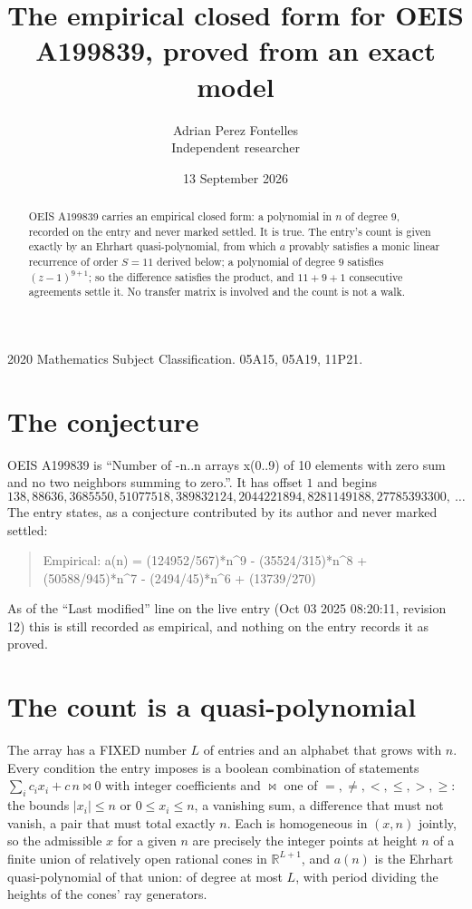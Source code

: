 \documentclass[11pt,a4paper]{article}
\title{The empirical closed form for OEIS A199839, proved from an exact model}
\author{Adrian Perez Fontelles\\ \small Independent researcher}
\date{13 September 2026}
\theoremstyle{plain}
\theoremstyle{definition}
\begin{document}
\maketitle

\begin{abstract}
OEIS A199839 carries an empirical closed form: a polynomial in $n$ of degree $9$, recorded on the
entry and never marked settled. It is true. The entry's count is given exactly by an Ehrhart
quasi-polynomial, from which $a$ provably satisfies a monic linear recurrence of order $S=11$
derived below; a polynomial of degree $9$ satisfies $(z-1)^{9+1}$; so the difference
satisfies the product, and $11+9+1$ consecutive agreements settle it. No transfer matrix is
involved and the count is not a walk.
\end{abstract}

\noindent\small 2020 Mathematics Subject Classification. 05A15, 05A19, 11P21.\normalsize

\section{The conjecture}

OEIS A199839 is ``Number of -n..n arrays x(0..9) of 10 elements with zero sum and no two neighbors summing to zero.''. It has offset $1$ and begins
\[
138, 88636, 3685550, 51077518, 389832124, 2044221894, 8281149188, 27785393300,\ \dots
\]
The entry states, as a conjecture contributed by its author and never marked settled:
\begin{quote}
Empirical: a(n) = (124952/567)*n\^{}9 - (35524/315)*n\^{}8 + (50588/945)*n\^{}7 - (2494/45)*n\^{}6 + (13739/270)
\end{quote}
As of the ``Last modified'' line on the live entry (Oct 03 2025 08:20:11, revision 12)
this is still recorded as empirical, and nothing on the entry records it as proved.

\section{The count is a quasi-polynomial}

The array has a FIXED number $L$ of entries and an alphabet that grows with $n$. Every
condition the entry imposes is a boolean combination of statements
$\sum_i c_ix_i + c\,n \bowtie 0$ with integer coefficients and $\bowtie$ one of
$=,\ne,<,\le,>,\ge$: the bounds $|x_i|\le n$ or $0\le x_i\le n$, a vanishing sum, a difference
that must not vanish, a pair that must total exactly $n$. Each is homogeneous in $(x,n)$
jointly, so the admissible $x$ for a given $n$ are precisely the integer points at height $n$
of a finite union of relatively open rational cones in $\mathbb{R}^{L+1}$, and $a(n)$ is
the Ehrhart quasi-polynomial of that union: of degree at most $L$, with period dividing the
heights of the cones' ray generators.
\end{document}
